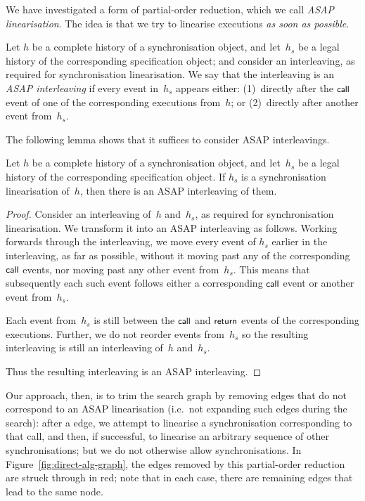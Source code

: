 We have investigated a form of partial-order reduction, which we call
\emph{ASAP linearisation}.  The idea is that we try to linearise executions
\emph{as soon as possible}.
%
\begin{definition}
Let $h$ be a complete history of a synchronisation object, and let~$h_s$ be a
legal history of the corresponding specification object; and consider an
interleaving, as required for synchronisation linearisation.  We say that the
interleaving is an \emph{ASAP interleaving} if every event in~$h_s$ appears
either: (1)~directly after the $\mbox{\sf{\small call}}$ event of one of the corresponding
executions from~$h$; or (2)~directly after another event from~$h_s$.
\end{definition}
%
The following lemma shows that it suffices to consider ASAP interleavings.
%
\begin{lemma}
Let $h$ be a complete history of a synchronisation object, and let~$h_s$ be a
legal history of the corresponding specification object.  If $h_s$ is a
synchronisation linearisation of~$h$, then there is an ASAP interleaving of
them.
\end{lemma}
%
\begin{proof}
Consider an interleaving of~$h$ and~$h_s$, as required for synchronisation
linearisation.  We transform it into an ASAP interleaving as follows.  Working
forwards through the interleaving, we move every event of $h_s$ earlier in the
interleaving, as far as possible, without it moving past any of the corresponding
$\mbox{\sf{\small call}}$ events, nor moving past any other event from~$h_s$.  This means that
subsequently each such event follows either a corresponding $\mbox{\sf{\small call}}$ event or
another event from~$h_s$.

Each event from~$h_s$ is still between the $\mbox{\sf{\small call}}$ and $\mbox{\sf{\small return}}$
events of the corresponding executions.  Further, we do not reorder events
from~$h_s$ so the resulting interleaving is still an interleaving of~$h$
and~$h_s$.

Thus the resulting interleaving is an ASAP interleaving.
\end{proof}
%
Our approach, then, is to trim the search graph by removing
 edges that do not correspond to an ASAP
linearisation (i.e.~not expanding such edges during the search): after a
 edge, we attempt to linearise a synchronisation corresponding
to that call, and then, if successful, to linearise an arbitrary sequence of
other synchronisations; but we do not otherwise allow synchronisations.  In
Figure~\ref{fig:direct-alg-graph}, the edges removed by this partial-order
reduction are struck through in red; note that in each case, there are
remaining edges that lead to the same node.

